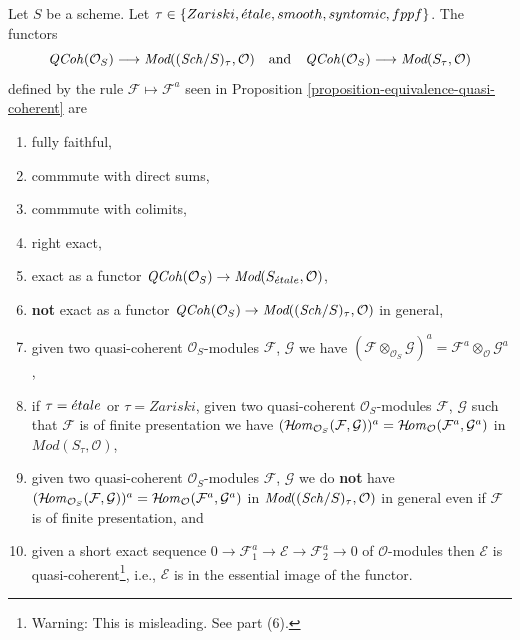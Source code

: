 \begin{lemma}
\label{lemma-equivalence-quasi-coherent-limits}
Let $S$ be a scheme.
Let $\tau \in \{Zariski, \linebreak[0] \etale,
\linebreak[0] smooth, \linebreak[0] syntomic, \linebreak[0] fppf\}$.
The functors
$$
\mathit{QCoh}(\mathcal{O}_S)
\longrightarrow
\textit{Mod}((\mathit{Sch}/S)_\tau, \mathcal{O})
\quad\text{and}\quad
\mathit{QCoh}(\mathcal{O}_S)
\longrightarrow
\textit{Mod}(S_\tau, \mathcal{O})
$$
defined by the rule $\mathcal{F} \mapsto \mathcal{F}^a$ seen in
Proposition \ref{proposition-equivalence-quasi-coherent}
are
\begin{enumerate}
\item fully faithful,
\item commmute with direct sums,
\item commmute with colimits,
\item right exact,
\item exact as a functor
$\mathit{QCoh}(\mathcal{O}_S) \to \textit{Mod}(S_{\acute{e}tale}, \mathcal{O})$,
\item {\bf not} exact as a functor
$\mathit{QCoh}(\mathcal{O}_S) \to
\textit{Mod}((\mathit{Sch}/S)_\tau, \mathcal{O})$
in general,
\item given two quasi-coherent $\mathcal{O}_S$-modules
$\mathcal{F}$, $\mathcal{G}$ we have
$(\mathcal{F} \otimes_{\mathcal{O}_S} \mathcal{G})^a =
\mathcal{F}^a \otimes_\mathcal{O} \mathcal{G}^a$,
\item if $\tau = {\acute{e}tale}$ or $\tau = Zariski$,
given two quasi-coherent $\mathcal{O}_S$-modules
$\mathcal{F}$, $\mathcal{G}$ such that $\mathcal{F}$
is of finite presentation we have
$(\mathop{\mathcal{H}\!\mathit{om}}\nolimits_{\mathcal{O}_S}(\mathcal{F}, \mathcal{G}))^a =
\mathop{\mathcal{H}\!\mathit{om}}\nolimits_\mathcal{O}(\mathcal{F}^a, \mathcal{G}^a)$ in
$\textit{Mod}(S_\tau, \mathcal{O})$,
\item given two quasi-coherent $\mathcal{O}_S$-modules
$\mathcal{F}$, $\mathcal{G}$ we do {\bf not} have
$(\mathop{\mathcal{H}\!\mathit{om}}\nolimits_{\mathcal{O}_S}(\mathcal{F}, \mathcal{G}))^a =
\mathop{\mathcal{H}\!\mathit{om}}\nolimits_\mathcal{O}(\mathcal{F}^a, \mathcal{G}^a)$
in $\textit{Mod}((\mathit{Sch}/S)_\tau, \mathcal{O})$ in general
even if $\mathcal{F}$ is of finite presentation, and
\item given a short exact sequence
$0 \to \mathcal{F}_1^a \to \mathcal{E} \to \mathcal{F}_2^a \to 0$
of $\mathcal{O}$-modules then $\mathcal{E}$ is
quasi-coherent\footnote{Warning: This is misleading. See part (6).}, i.e.,
$\mathcal{E}$ is in the essential image of the functor.
\end{enumerate}
\end{lemma}

